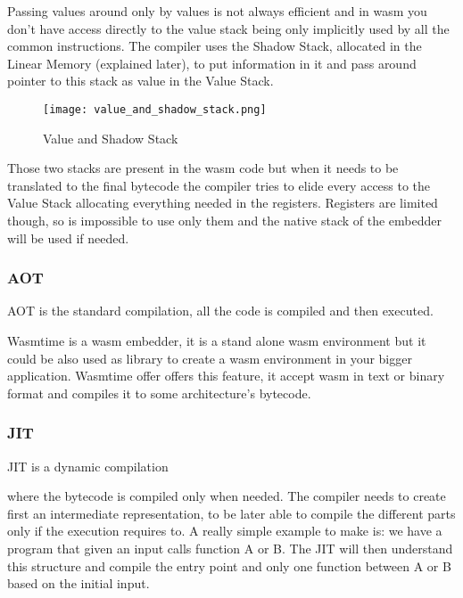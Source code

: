 \documentclass[../main.tex]{subfiles}
\begin{document}
Passing values around only by values is not always efficient and in wasm you don't have access directly to the value stack being only implicitly used by all the common instructions. The compiler uses the Shadow Stack, allocated in the Linear Memory (explained later), to put information in it and pass around pointer to this stack as value in the Value Stack.


\begin{figure}[h]
  \centering
  \texttt{[image: value\_and\_shadow\_stack.png]}
  \caption{Value and Shadow Stack}
  \label{fig:value-shadow-stack}
\end{figure}

Those two stacks are present in the wasm code but when it needs to be translated to the final bytecode the compiler tries to elide every access to the Value Stack allocating everything needed in the registers. Registers are limited though, so is impossible to use only them and the native stack of the embedder will be used if needed.



\subsubsection{AOT}


AOT is the standard compilation, all the code is compiled and then executed. 

Wasmtime is a wasm embedder, it is a stand alone wasm environment but it could be also used as library to create a wasm environment in your bigger application. Wasmtime offer offers this feature, it accept wasm in text or binary format and compiles it to some architecture's bytecode.


\subsubsection{JIT}

JIT is a dynamic compilation 


where the bytecode is compiled only when needed. The compiler needs to create first an intermediate representation, to be later able to compile the different parts only if the execution requires to. A really simple example to make is: we have a program that given an input calls function A or B. The JIT  will then understand this structure and compile the entry point and only one function between A or B based on the initial input.
\end{document}

